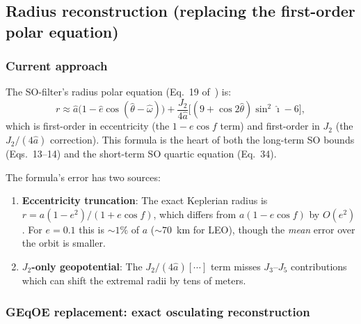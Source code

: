 \documentclass[11pt]{article}
\begin{document}
\subsection{Radius reconstruction (replacing the first-order polar equation)}
\label{sec:radius_replacement}

\subsubsection{Current approach}

The SO-filter's radius polar equation (Eq.~19 of~\cite{rivero2025}) is:
\begin{equation}
r \approx \hat a\bigl(1 - \hat e\cos(\hat\theta - \hat\omega)\bigr)
+ \frac{J_2}{4\hat a}\bigl[(9 + \cos 2\hat\theta)\sin^2\hat\imath - 6\bigr],
\label{eq:rivero_radius}
\end{equation}
which is first-order in eccentricity (the $1 - e\cos f$ term) and
first-order in $J_2$ (the $J_2/(4\hat a)$ correction). This formula is the
heart of both the long-term SO bounds (Eqs.~13--14) and the short-term SO
quartic equation (Eq.~34).

The formula's error has two sources:
\begin{enumerate}
\item \textbf{Eccentricity truncation}: The exact Keplerian radius is
$r = a(1-e^2)/(1+e\cos f)$, which differs from $a(1-e\cos f)$ by
$O(e^2)$. For $e = 0.1$ this is $\sim\!1\%$ of $a$ ($\sim\!70$~km for LEO),
though the \emph{mean} error over the orbit is smaller.
\item \textbf{$J_2$-only geopotential}: The $J_2/(4\hat a)[\cdots]$ term
misses $J_3$--$J_5$ contributions which can shift the extremal radii by
tens of meters.
\end{enumerate}

\subsubsection{GEqOE replacement: exact osculating reconstruction}
\end{document}
